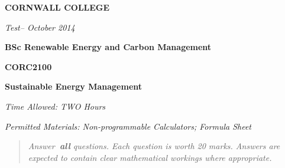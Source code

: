 \documentclass[a4paper,12pt,fleqn]{article}
\newcommand{\institution}{CORNWALL COLLEGE}
\newcommand{\titlehd}{BSc Renewable Energy and Carbon Management}
\newcommand{\examtype}{Test}
\newcommand{\examdate}{October 2014}
\newcommand{\examcode}{CORC2100}
\newcommand{\examtitle}{Sustainable Energy Management}
\newcommand{\readtime}{15 Minutes}
\newcommand{\writetime}{TWO Hours}
\newcommand{\materials}{Non-programmable Calculators; Formula Sheet}
\begin{document}

\begin{center}
\large\textbf{\institution}
\end{center}
\vspace{1cm}

\begin{center}
\textit{ \examtype -- \examdate}
\end{center}
\vspace{1cm}

\begin{center}
\large\textbf{\titlehd}
\end{center}

\begin{center}
\large\textbf{\examcode}
\end{center}
\begin{center}
\large\textbf{\examtitle}
\end{center}
\vspace{4cm}
\vspace{4cm}

\begin{center}
\end{center}
\begin{center}
\textit{Time Allowed:  \writetime}
\end{center}
\begin{center}
\textit{Permitted Materials: \materials}
\end{center}





\newpage
\begin{quote}
\textit{Answer\textbf{\ all} questions.  Each question is worth 20 marks. Answers are expected to contain clear mathematical workings where appropriate.}
\end{quote}

\bigskip
\end{document}

